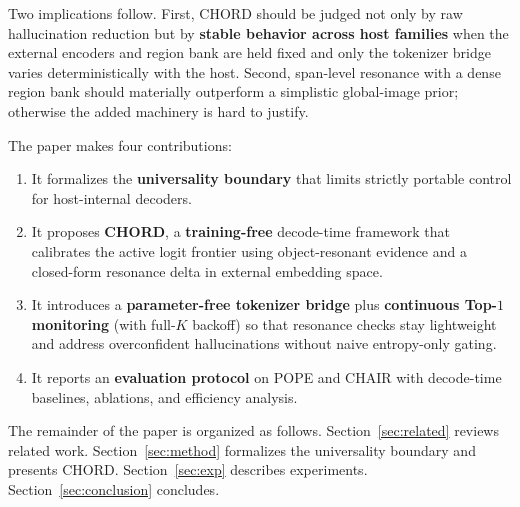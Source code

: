 Two implications follow. First, CHORD should be judged not only by raw hallucination reduction but by \textbf{stable behavior across host families} when the external encoders and region bank are held fixed and only the tokenizer bridge varies deterministically with the host. Second, span-level resonance with a dense region bank should materially outperform a simplistic global-image prior; otherwise the added machinery is hard to justify.

The paper makes four contributions:
\begin{enumerate}
  \item It formalizes the \textbf{universality boundary} that limits strictly portable control for host-internal decoders.
  \item It proposes \textbf{CHORD}, a \textbf{training-free} decode-time framework that calibrates the active logit frontier using object-resonant evidence and a closed-form resonance delta in external embedding space.
  \item It introduces a \textbf{parameter-free tokenizer bridge} plus \textbf{continuous Top-$1$ monitoring} (with full-$K$ backoff) so that resonance checks stay lightweight and address overconfident hallucinations without naive entropy-only gating.
  \item It reports an \textbf{evaluation protocol} on POPE and CHAIR with decode-time baselines, ablations, and efficiency analysis.
\end{enumerate}

The remainder of the paper is organized as follows. Section~\ref{sec:related} reviews related work. Section~\ref{sec:method} formalizes the universality boundary and presents CHORD. Section~\ref{sec:exp} describes experiments. Section~\ref{sec:conclusion} concludes.

